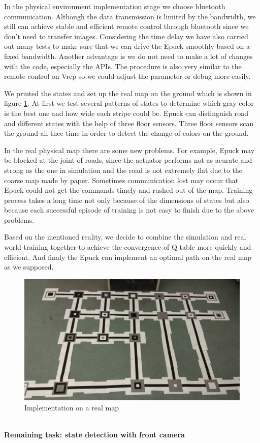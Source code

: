 \documentclass[a4paper, 11pt]{article} %
\begin{document}
In the physical environment implementation stage we choose bluetooth communication. Although the data transmission is limited by the bandwidth, we still can achieve stable and efficient remote control through bluetooth since we don't need to transfer images. Considering the time delay we have also carried out many tests to make sure that we can drive the Epuck smoothly based on a fixed bandwidth. Another advantage is we do not need to make a lot of changes with the code, especially the APIs. The procedure is also very similar to the remote control on Vrep so we could adjust the parameter or debug more easily.

We printed the states and set up the real map on the ground which is shown in figure \ref{fig3}. At first we test several patterns of states to determine which gray color is the best one and how wide each stripe could be. Epuck can distinguish road and different states with the help
of three floor sensors. Three floor sensors scan the ground all thee time in order to
detect the change of colors on the ground.

In the real physical map there are some new problems. For example, Epuck may be blocked at the joint of roads, since the actuator performs not as acurate and strong as the one in simulation and the road is not extremely flat due to the coarse map made by paper. Sometimes communication lost may occur that Epuck could not get the commands timely and rushed out of the map. Training process takes a long time not only because of the dimensions of states but also because each successful episode of training is not easy to finish due to the above problems.

Based on the mentioned reality, we decide to combine the simulation and real world training together to achieve the convergence of Q table more quickly and efficient. And finaly the Epuck can implement an optimal path on the real map as we supposed.
\begin{figure}[tb]
\centering 
\includegraphics[width=0.95\columnwidth]{RealMap} 
\caption[An example of a floating figure]{Implementation on a real map} %
\label{fig3} 
\end{figure}
\\[3ex]
\textbf{Remaining task: state detection with front camera}
\end{document}
